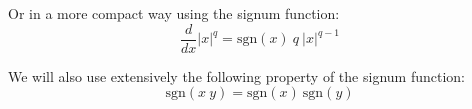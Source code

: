 Or in a more compact way using the signum function:
\begin{equation}
\frac{d}{dx}|x|^q = \text{sgn}(x) \ q \ |x|^{q-1}
\end{equation}

We will also use extensively the following property of the signum function:
\begin{equation}
\text{sgn}(x \ y) = \text{sgn}(x) \ \text{sgn}(y)
\end{equation}